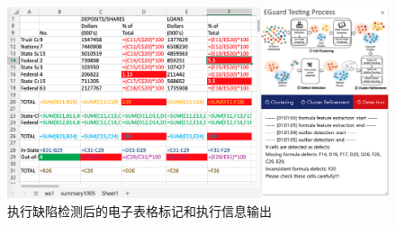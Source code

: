 \begin{figure}[tp]   
    \centering
    \includegraphics[width=\textwidth]{figure/eg/eguard-4.png}
    \caption{\eg 执行缺陷检测后的电子表格标记和执行信息输出}
    \label{figure-eg4}
\end{figure}